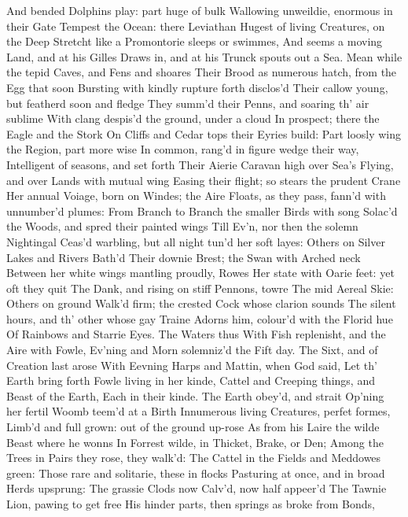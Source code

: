 \documentclass[11pt]{book}
\newcounter {last}
\begin{document}
And bended Dolphins play: part huge of bulk 
Wallowing unweildie, enormous in their Gate 
Tempest the Ocean: there Leviathan 
Hugest of living Creatures, on the Deep 
Stretcht like a Promontorie sleeps or swimmes, 
And seems a moving Land, and at his Gilles 
Draws in, and at his Trunck spouts out a Sea. 
Mean while the tepid Caves, and Fens and shoares 
Their Brood as numerous hatch, from the Egg that soon 
Bursting with kindly rupture forth disclos'd 
Their callow young, but featherd soon and fledge 
They summ'd their Penns, and soaring th' air sublime 
With clang despis'd the ground, under a cloud 
In prospect; there the Eagle and the Stork 
On Cliffs and Cedar tops their Eyries build: 
Part loosly wing the Region, part more wise 
In common, rang'd in figure wedge their way, 
Intelligent of seasons, and set forth 
Their Aierie Caravan high over Sea's 
Flying, and over Lands with mutual wing 
Easing their flight; so stears the prudent Crane 
Her annual Voiage, born on Windes; the Aire 
Floats, as they pass, fann'd with unnumber'd plumes: 
From Branch to Branch the smaller Birds with song 
Solac'd the Woods, and spred their painted wings 
Till Ev'n, nor then the solemn Nightingal 
Ceas'd warbling, but all night tun'd her soft layes: 
Others on Silver Lakes and Rivers Bath'd 
Their downie Brest; the Swan with Arched neck 
Between her white wings mantling proudly, Rowes 
Her state with Oarie feet: yet oft they quit 
The Dank, and rising on stiff Pennons, towre 
The mid Aereal Skie: Others on ground 
Walk'd firm; the crested Cock whose clarion sounds 
The silent hours, and th' other whose gay Traine 
Adorns him, colour'd with the Florid hue 
Of Rainbows and Starrie Eyes.  The Waters thus 
With Fish replenisht, and the Aire with Fowle, 
Ev'ning and Morn solemniz'd the Fift day. 
\quad The Sixt, and of Creation last arose 
With Eevning Harps and Mattin, when God said, 
Let th' Earth bring forth Fowle living in her kinde, 
Cattel and Creeping things, and Beast of the Earth, 
Each in their kinde.  The Earth obey'd, and strait 
Op'ning her fertil Woomb teem'd at a Birth 
Innumerous living Creatures, perfet formes, 
Limb'd and full grown: out of the ground up-rose 
As from his Laire the wilde Beast where he wonns 
In Forrest wilde, in Thicket, Brake, or Den; 
Among the Trees in Pairs they rose, they walk'd: 
The Cattel in the Fields and Meddowes green: 
Those rare and solitarie, these in flocks 
Pasturing at once, and in broad Herds upsprung: 
The grassie Clods now Calv'd, now half appeer'd 
The Tawnie Lion, pawing to get free 
His hinder parts, then springs as broke from Bonds, 
\end{document}
